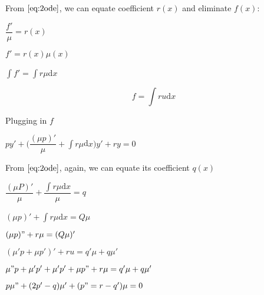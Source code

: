 \documentclass{article}
\begin{document}
From $\eqref{eq:2ode}$, we can equate coefficient $r(x)$ and eliminate $f(x)$:
\begin{center}
$\dfrac{f'}{\mu} = r(x)$

$f' = r(x)\mu (x)$

$\int f' = \int r \mu $d$x$
\end{center}
\begin{equation} \label{r}
f = \int ru \mathrm{d}x
\end{equation}

Plugging in $f$

\begin{center}
$py' + (\dfrac{(\mu p)'}{\mu} + \int r\mu $d$x)y' + ry = 0$
\end{center}

From $\eqref{eq:2ode}$, again, we can equate its coefficient $q(x)$
\begin{center}
$\dfrac{(\mu P)'}{\mu} + \dfrac{\int r \mu \mathrm{d}x}{\mu} = q$

$(\mu p)' + \int r \mu$d$x = Q \mu$

$(\mu p)" + r\mu = (Q \mu )'$

$(\mu ' p + \mu p')' + ru = q'\mu + q\mu '$

$\mu "p + \mu ' p' + \mu 'p' + \mu p" + r\mu = q'\mu + q\mu '$

$p\mu " + (2p' - q)\mu ' + (p" = r -q')\mu = 0$
\end{center}
\end{document}
